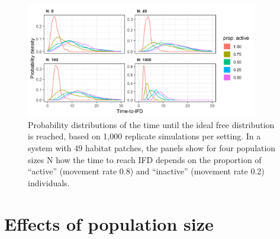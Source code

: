 \begin{refsection}
	\begin{figure}[!h]
		\centering
		\includegraphics[width=0.9\textwidth]{figures/boxes/details3.png}
		\caption{
			Probability distributions of the time until the ideal free distribution is reached, based on 1,000 replicate simulations per setting. 
			In a system with 49 habitat patches, the panels show for four population sizes N how the time to reach IFD depends on the proportion of ``active'' (movement rate 0.8) and ``inactive'' (movement rate 0.2) individuals.
		}\label{fig_details_03}
	\end{figure}

	\section*{Effects of population size}
	

\end{refsection}
